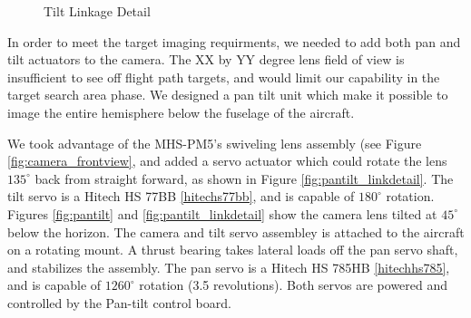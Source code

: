 \documentclass[10pt,twocolumns]{report}
\newcommand{\degrees}[1]
{
\begin{math}
#1^{\circ} 
\end{math}
}
\begin{document}
\begin{figure}
	\caption{Tilt Linkage Detail}
	\label{fig:pantilt_link}
\end{figure}

In order to meet the target imaging requirments, we needed to add both pan and tilt actuators to the camera. The XX by YY degree lens field of view is insufficient to see off flight path targets, and would limit our capability in the target search area phase. 
We designed a pan tilt unit which make it possible to image the entire hemisphere below the fuselage of the aircraft.

We took advantage of the MHS-PM5's swiveling lens assembly 
(see Figure \ref{fig:camera_frontview}, and added a servo actuator which could rotate the lens \degrees{135} back from straight forward, as shown in Figure \ref{fig:pantilt_linkdetail}. The tilt servo is a Hitech HS 77BB \ref{hitechs77bb}, and is capable of \degrees{180} rotation. Figures \ref{fig:pantilt} and \ref{fig:pantilt_linkdetail} show the camera lens tilted at \degrees{45} below the horizon.
The camera and tilt servo assembley is attached to the aircraft on a rotating mount. A thrust bearing takes lateral loads off the pan servo shaft, and stabilizes the assembly. The pan servo is a Hitech HS 785HB \ref{hitechhs785}, and is capable of \degrees{1260} rotation (3.5 revolutions). Both servos are powered and controlled by the Pan-tilt control board.
\end{document}

